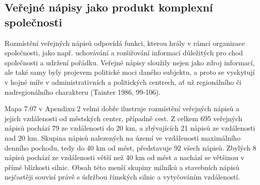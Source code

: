 \subsection[veřejné-nápisy-jako-produkt-komplexní-společnosti]{Veřejné nápisy jako produkt komplexní společnosti}

Rozmístění veřejných nápisů odpovídá funkci, kterou hrály v rámci organizace společnosti, jako např. uchovávání a rozšiřování informací důležitých pro chod společnosti a udržení pořádku. Veřejné nápisy sloužily nejen jako zdroj informací, ale také samy byly projevem politické moci daného subjektu, a proto se vyskytují v hojné míře v administrativních a politických centrech, ať už regionálního či nadregionálního charakteru (Tainter 1986, 99-106).

Mapa 7.07 v Apendixu 2 velmi dobře ilustruje rozmístění veřejných nápisů a jejich vzdálenosti od městských center, případně cest. Z celkem 695 veřejných nápisů pochází 79  ze vzdálenosti do 20 km, a zbývajících 21  nápisů ze vzdálenosti nad 20 km. Skupina nápisů nalezených na území ve vzdálenosti maximálního denního pochodu, tedy do 40 km od měst, představuje 92  všech nápisů. Zbylých 8  nápisů pochází ze vzdálenosti větší než 40 km od měst a nachází se většinou v přímé blízkosti silnic. Obsah této menší skupiny milníků a stavebních nápisů nejčastěji souvisí právě s údržbou římských silnic a vytyčováním vzdáleností.\crlf
